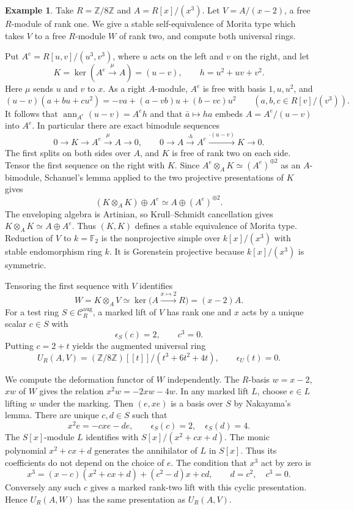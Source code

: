 \documentclass[12pt,a4paper,english,reqno]{amsart}
\numberwithin{equation}{section}
\theoremstyle{plain}
\theoremstyle{definition}
\newtheorem{example}[theorem]{Example}
\begin{document}
\begin{example}\label{ex:artin-module-deformation-syzygy}
Take $R=\mathbb Z/8\mathbb Z$ and $A=R[x]/(x^3)$. Let
$V=A/(x-2)$, a free $R$-module of rank one. We give a stable
self-equivalence of Morita type which takes $V$ to a free
$R$-module $W$ of rank two, and compute both universal rings.

Put $A^e=R[u,v]/(u^3,v^3)$, where $u$ acts on the left and
$v$ on the right, and let
\[
 K=\ker(A^e\xrightarrow{\mu}A)=(u-v),
 \qquad h=u^2+uv+v^2.
\]
Here $\mu$ sends $u$ and $v$ to $x$. As a right $A$-module,
$A^e$ is free with basis $1,u,u^2$, and
\[
 (u-v)(a+bu+cu^2)=-va+(a-vb)u+(b-vc)u^2
 \qquad(a,b,c\in R[v]/(v^3)).
\]
It follows that $\operatorname{ann}_{A^e}(u-v)=A^eh$ and that
$\bar a\mapsto h a$ embeds $A=A^e/(u-v)$ into $A^e$. In
particular there are exact bimodule sequences
\[
 0\longrightarrow K\longrightarrow A^e
   \xrightarrow{\mu}A\longrightarrow0,\qquad
 0\longrightarrow A\xrightarrow{\cdot h}A^e
   \xrightarrow{\cdot(u-v)}K\longrightarrow0.
\]
The first splits on both sides over $A$, and $K$ is free of
rank two on each side. Tensor the first sequence on the right
with $K$. Since $A^e\otimes_A K\simeq (A^e)^{\oplus2}$ as
an $A$-bimodule, Schanuel's lemma applied to the two projective
presentations of $K$ gives
\[
 (K\otimes_A K)\oplus A^e
      \simeq A\oplus (A^e)^{\oplus2}.
\]
The enveloping algebra is Artinian, so Krull--Schmidt
cancellation gives $K\otimes_A K\simeq A\oplus A^e$.
Thus $(K,K)$ defines a stable equivalence of Morita type.
Reduction of $V$ to $k=\mathbb F_2$ is the nonprojective
simple over $k[x]/(x^3)$ with stable endomorphism ring $k$.
It is Gorenstein projective because $k[x]/(x^3)$ is symmetric.

Tensoring the first sequence with $V$ identifies
\[
 W=K\otimes_A V
    \simeq\ker\bigl(A\xrightarrow{x\mapsto2}R\bigr)
    =(x-2)A.
\]
For a test ring $S\in\mathcal C_R^{\mathrm{aug}}$, a marked
lift of $V$ has rank one and $x$ acts by a unique scalar
$c\in S$ with
\[
 \epsilon_S(c)=2,\qquad c^3=0.
\]
Putting $c=2+t$ yields the augmented universal ring
\[
 U_R(A,V)=
   (\mathbb Z/8\mathbb Z)[[t]]/(t^3+6t^2+4t),
 \qquad \epsilon_U(t)=0.
\]

We compute the deformation functor of $W$ independently.
The $R$-basis $w=x-2$, $xw$ of $W$ gives the relation
$x^2w=-2xw-4w$. In any marked lift $L$, choose $e\in L$
lifting $w$ under the marking. Then $(e,xe)$ is a basis
over $S$ by Nakayama's lemma. There are unique $c,d\in S$
such that
\[
 x^2e=-cxe-de,\qquad
 \epsilon_S(c)=2,\quad \epsilon_S(d)=4.
\]
The $S[x]$-module $L$ identifies with $S[x]/(x^2+cx+d)$.
The monic polynomial $x^2+cx+d$ generates the annihilator
of $L$ in $S[x]$. Thus its coefficients do not depend on the
choice of $e$. The condition that $x^3$ act by zero is
\[
 x^3=(x-c)(x^2+cx+d)+(c^2-d)x+cd,
 \qquad
 d=c^2,\quad c^3=0.
\]
Conversely any such $c$ gives a marked rank-two lift with
this cyclic presentation. Hence $U_R(A,W)$ has the same
presentation as $U_R(A,V)$.


\end{example}
\end{document}
